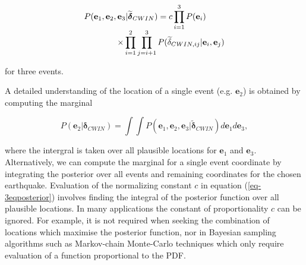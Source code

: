 \documentclass[12pt,double]{article}
\newcommand{\mitbf}[1]{  
  \hbox{\mathversion{bold}$#1$}}
\begin{document}
\begin{linenomath*} \begin{equation}
\label{eq-3eqposterior}
\begin{array}{l}
P(\mathbf{e}_1, \mathbf{e}_2, \mathbf{e}_3 | \widetilde{\mitbf{\delta}}_{CWIN}) = c \displaystyle \prod_{i=1}^3 P(\mathbf{e}_i) \\
\hspace{4em}  \times \displaystyle \prod_{i=1}^2 \prod_{j=i+1}^3
P(\widetilde{\delta}_{CWIN,ij}|\mathbf{e}_i,\mathbf{e}_j)
\end{array}
\end{equation} \end{linenomath*}
for three events.

A detailed understanding of the location of a single event (e.g. $\mathbf{e}_2$) is obtained by computing the
marginal
\begin{linenomath*} \begin{equation}
\label{eq:-E2-marginal}
P(\mathbf{e}_2|\mathbf{\delta}_{CWIN}) = \int \int P(\mathbf{e}_1, \mathbf{e}_2,
 \mathbf{e}_3 | \widetilde{\mathbf{\delta}}_{CWIN}) d\mathbf{e}_1
 d\mathbf{e}_3,
\end{equation} \end{linenomath*}
where the intergral is taken over all plausible locations for
$\mathbf{e}_1$ and $\mathbf{e}_3$. Alternatively, we can compute the
marginal for a single event coordinate by integrating the posterior
over all events and remaining coordinates for the chosen earthquake.
Evaluation of the normalizing constant $c$ in equation (\ref{eq-3eqposterior}) involves
finding the integral of the posterior function
over all plausible locations. In many applications the constant
of proportionality $c$ can be ignored. For example, it is not
required when seeking the combination of locations which maximise
 the posterior function, nor in Bayesian sampling algorithms such as Markov-chain Monte-Carlo
techniques which only require evaluation of a function proportional to the PDF.
\end{document}
